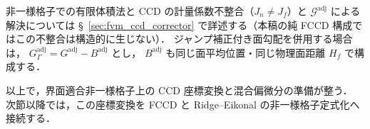 \medskip

非一様格子での有限体積法と CCD の計量係数不整合（$J_n \neq J_f$）と $\mathcal{G}^\text{adj}$ による解決については §~\ref{sec:fvm_ccd_corrector} で詳述する（本稿の純 FCCD 構成ではこの不整合は構造的に生じない）．
ジャンプ補正付き面勾配を併用する場合は，
$G_{\Gamma}^{\mathrm{adj}}=G^{\mathrm{adj}}-B^{\mathrm{adj}}$ とし，
$B^{\mathrm{adj}}$ も同じ面平均位置・同じ物理面距離 $H_f$ で構成する．

以上で，界面適合非一様格子上の CCD 座標変換と混合偏微分の準備が整う．
次節以降では，この座標変換を FCCD と Ridge--Eikonal の非一様格子定式化へ接続する．
